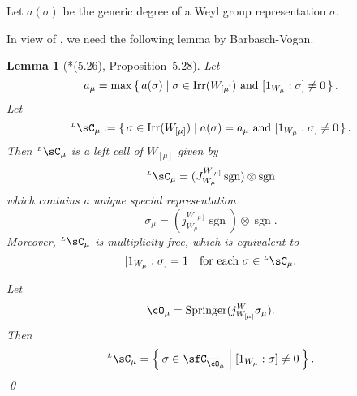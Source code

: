 \documentclass[12pt,a4paper]{amsart}
\newcommand{\sgn}{\operatorname{sgn}}
\newcommand{\e}{\mathfrak e}
\numberwithin{equation}{section}
\newtheorem{lem}[thm]{Lemma}
\theoremstyle{remark}
\def\Irr{\mathrm{Irr}}
\def\lamck{\lambda_\ckcO}
\def\WLamck{W_{[\lambda_{\ckcO}]}}
\def\Wlamck{W_{\lamck}}
\def\LC{{}^{\scriptscriptstyle L}\sC}
\def\Spr{\mathrm{Springer}}
\begin{document}
Let $a(\sigma)$ be the generic degree of a Weyl group representation $\sigma$.

In view of , we need the following lemma by Barbasch-Vogan. %
\begin{lem}[{\cite{BVUni}*{(5.26), Proposition~5.28}}]
  \label{lem:LC.mu}
  Let
  \[
    a_{\mu} = \max\set{a(\sigma)| \sigma \in \Irr(W_{[\mu]}) \text{ and }
    [1_{W_{\mu}}: \sigma]\neq 0}.
  \]
  Let
  \[
    \LC_{\mu} :=
    \set{\sigma \in \Irr(W_{[\mu]}) | a(\sigma) = a_{\mu}
      \text{ and } [1_{W_{\mu}}: \sigma]\neq   0
    }.
  \]
  Then
  $\LC_{\mu}$ is a left cell of $W_{[\mu]}$ given by
  \begin{equation}\label{eq:LC.mu}
  \LC_{\mu}=(J_{W_{\mu}}^{W_{[\mu]}} \sgn )\otimes \sgn
  \end{equation}
  which contains a unique special representation
  \[
    \sigma_{\mu}=(j_{W_{\mu}}^{W_{[\mu]}} \sgn )\otimes \sgn.
  \]
  Moreover, $\LC_{\mu}$ is multiplicity free, which is equivalent to
  \[
  [1_{W_{\mu}}:\sigma]=1 \quad \text{for each } \sigma\in \LC_{\mu}.
  \]

  Let
  \begin{equation}\label{eq:O.mu}
    \cO_{\mu} = \Spr(j_{W_{[\mu]}}^{W}\sigma_{\mu}).
  \end{equation}
Then
  \[
    \LC_{\mu} = \Set{\sigma\in \sfC_{\bcO_{\mu}}| [1_{W_{\mu}}:\sigma]\neq 0}.
  \]
  \qed
\end{lem}
\end{document}
